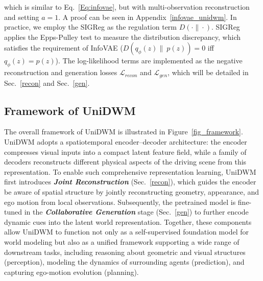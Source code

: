 which is similar to Eq.~\ref{Eq:infovae}, but with multi-observation reconstruction and setting $a=1$. A proof can be seen in Appendix~\ref{infovae_unidwm}. In practice, we employ the SIGReg \cite{balestriero2025lejepa} as the regulation term $D(\cdot\|\cdot)$. SIGReg applies the Epps-Pulley test to measure the distribution discrepancy, which satisfies the requirement of InfoVAE ($D(q_\phi(z) \|\ p(z)) = 0$ iff $q_\phi(z) = p(z)$). The log-likelihood terms are implemented as the negative reconstruction and generation losses $\mathcal{L}_{recon}$ and $\mathcal{L}_{gen}$, which will be detailed in Sec.~\ref{recon} and Sec.~\ref{gen}.

\subsection{Framework of UniDWM}
The overall framework of UniDWM is illustrated in Figure~\ref{fig_framework}. UniDWM adopts a spatiotemporal encoder–decoder architecture: the encoder compresses visual inputs into a compact latent feature field, while a family of decoders reconstructs different physical aspects of the driving scene from this representation. To enable such comprehensive representation learning, UniDWM first introduces \textbf{\textit{Joint Reconstruction}} (Sec.~\ref{recon}), which guides the encoder be aware of spatial structure by jointly reconstructing geometry, appearance, and ego motion from local observations. Subsequently, the pretrained model is fine-tuned in the \textbf{\textit{Collaborative Generation}} stage (Sec.~\ref{gen}) to further encode dynamic cues into the latent world representation. Together, these components allow UniDWM to function not only as a self-supervised foundation model for world modeling but also as a unified framework supporting a wide range of downstream tasks, including reasoning about geometric and visual structures (perception), modeling the dynamics of surrounding agents (prediction), and capturing ego-motion evolution (planning).


